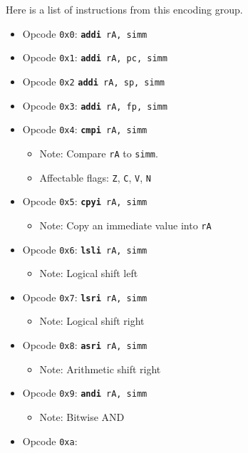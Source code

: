 \documentclass{article}
\begin{document}
	Here is a list of instructions from this encoding group.

	\singlespacing
	\begin{itemize}
		\item Opcode \texttt{0x0}:
			\texttt{\textbf{addi} rA, simm}
		\item Opcode \texttt{0x1}:
			\texttt{\textbf{addi} rA, pc, simm}
		\item Opcode \texttt{0x2}
			\texttt{\textbf{addi} rA, sp, simm}
		\item Opcode \texttt{0x3}:
			\texttt{\textbf{addi} rA, fp, simm}
		\item Opcode \texttt{0x4}:
			\texttt{\textbf{cmpi} rA, simm}
		\begin{itemize}
			\item Note:  Compare \texttt{rA} to \texttt{simm}.
			\item Affectable flags:
				\texttt{Z}, \texttt{C}, \texttt{V}, \texttt{N}
		\end{itemize}
		\item Opcode \texttt{0x5}:
			\texttt{\textbf{cpyi} rA, simm}
		\begin{itemize}
			\item Note:  Copy an immediate value into \texttt{rA}
		\end{itemize}
		\item Opcode \texttt{0x6}:
			\texttt{\textbf{lsli} rA, simm}
		\begin{itemize}
			\item Note:  Logical shift left
		\end{itemize}
		\item Opcode \texttt{0x7}:
			\texttt{\textbf{lsri} rA, simm}
		\begin{itemize}
			\item Note:  Logical shift right
		\end{itemize}
		\item Opcode \texttt{0x8}:
			\texttt{\textbf{asri} rA, simm}
		\begin{itemize}
			\item Note:  Arithmetic shift right
		\end{itemize}
		\item Opcode \texttt{0x9}:
			\texttt{\textbf{andi} rA, simm}
		\begin{itemize}
			\item Note:  Bitwise AND
		\end{itemize}
		\item Opcode \texttt{0xa}:

\end{itemize}
\end{document}
